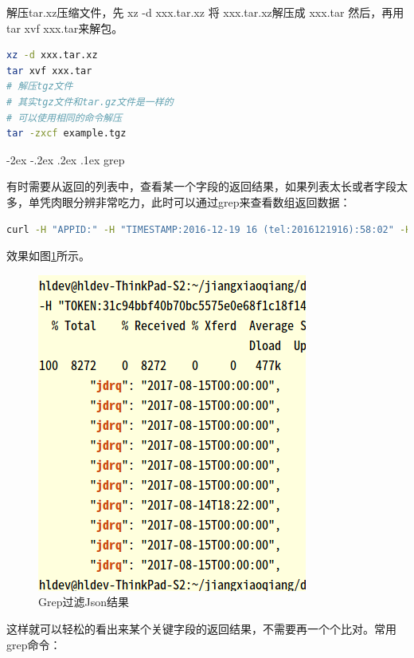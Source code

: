 \documentclass[12pt]{book}
\makeatletter
\numberwithin{dummy}{section}
\theoremstyle{ocrenumbox}
\theoremstyle{blacknumex}
\theoremstyle{blacknumbox}
\theoremstyle{ocrenum}
\renewcommand\paragraph{\@startsection{paragraph}{4}{\z@}
	{-2ex \@plus-.2ex \@minus .2ex}
	{.1ex}
	{\normalfont\small\sffamily\bfseries}}
\makeatother
\begin{document}
解压tar.xz压缩文件，先 xz -d xxx.tar.xz 将 xxx.tar.xz解压成 xxx.tar 然后，再用 tar xvf xxx.tar来解包。


\begin{lstlisting}[language=Bash]
xz -d xxx.tar.xz
tar xvf xxx.tar
# 解压tgz文件
# 其实tgz文件和tar.gz文件是一样的
# 可以使用相同的命令解压	
tar -zxcf example.tgz
\end{lstlisting}

\paragraph{grep}

有时需要从返回的列表中，查看某一个字段的返回结果，如果列表太长或者字段太多，单凭肉眼分辨非常吃力，此时可以通过grep来查看数组返回数据：

\begin{lstlisting}[language=Bash]
curl -H "APPID:" -H "TIMESTAMP:2016-12-19 16 (tel:2016121916):58:02" -H "ECHOSTR:" -H "TOKEN:" http://10.10.1.12:28080/api/xzxk?xdr= | jq '.' |grep jdrq
\end{lstlisting}

效果如图\ref{fig:grepfilterreturnvalue}所示。

\begin{figure}[htbp]
	\centering
	\includegraphics[scale=0.5]{grepfilterreturnvalue.png}
	\caption{Grep过滤Json结果}
	\label{fig:grepfilterreturnvalue}
\end{figure}

这样就可以轻松的看出来某个关键字段的返回结果，不需要再一个个比对。常用grep命令：
\end{document}
